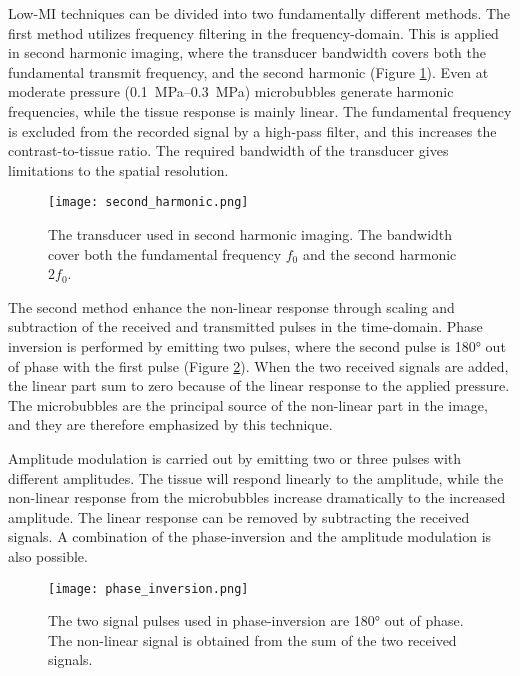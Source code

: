Low-MI techniques can be divided into two fundamentally different methods. The first method utilizes frequency filtering in the frequency-domain. This is applied in second harmonic imaging, where the transducer bandwidth covers both the fundamental transmit frequency, and the second harmonic (Figure \ref{Fig:Second harmonic}). Even at moderate pressure (\SIrange{0.1}{0.3}{\mega\pascal}) microbubbles generate harmonic frequencies, while the tissue response is mainly linear. The fundamental frequency is excluded from the recorded signal by a high-pass filter, and this increases the contrast-to-tissue ratio. The required bandwidth of the transducer gives limitations to the spatial resolution.

\begin{figure}[h]
  \centering
  \texttt{[image: second\_harmonic.png]}
  \caption{The transducer used in second harmonic imaging. The bandwidth cover both the fundamental frequency $f_0$ and the second harmonic $2f_0$\cite{Hoskins2010}.}
  \label{Fig:Second harmonic}
\end{figure}

The second method enhance the non-linear response through scaling and subtraction of the received and transmitted pulses in the time-domain. Phase inversion is performed by emitting two pulses, where the second pulse is \ang{180} out of phase with the first pulse (Figure \ref{Fig:phase inversion}). When the two received signals are added, the linear part sum to zero because of the linear response to the applied pressure. The microbubbles are the principal source of the non-linear part in the image, and they are therefore emphasized by this technique.

Amplitude modulation is carried out by emitting two or three pulses with different amplitudes. The tissue will respond linearly to the amplitude, while the non-linear response from the microbubbles increase dramatically to the increased amplitude. The linear response can be removed by subtracting the received signals. A combination of the phase-inversion and the amplitude modulation is also possible. 

\begin{figure}[h]
  \centering
  \texttt{[image: phase\_inversion.png]}
  \caption{The two signal pulses used in phase-inversion are \ang{180} out of phase. The non-linear signal is obtained from the sum of the two received signals\cite{Hoskins2010}.}
  \label{Fig:phase inversion}
\end{figure}
\clearpage
